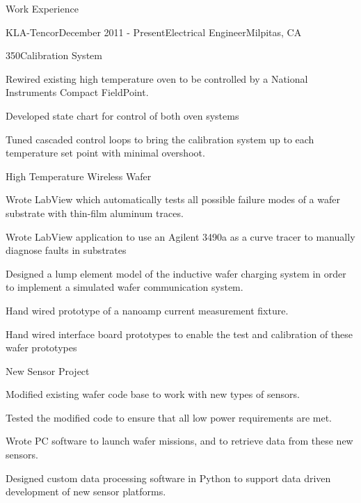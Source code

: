 \documentclass{resume} %
\begin{document}

\begin{rSection}{Work Experience}

\begin{rSubsection}{KLA-Tencor}{December 2011 - Present}{Electrical Engineer}{Milpitas, CA}

\begin{rWorkProject}{350\celsius \space Calibration System}
\item Rewired existing high temperature oven to be controlled by a National Instruments Compact FieldPoint.
\item Developed state chart for control of both oven systems
\item Tuned cascaded control loops to bring the calibration system up to each temperature set point with minimal overshoot.
\end{rWorkProject}

\begin{rWorkProject}{High Temperature Wireless Wafer}
\item Wrote LabView which automatically tests all possible failure modes of a wafer substrate with thin-film aluminum traces.
\item Wrote LabView application to use an Agilent 3490a as a curve tracer to manually diagnose faults in substrates
\item Designed a lump element model of the inductive wafer charging system in order to implement a simulated wafer communication system.
\item Hand wired prototype of a nanoamp current measurement fixture.
\item Hand wired interface board prototypes to enable the test and calibration of these wafer prototypes
\end{rWorkProject}

\begin{rWorkProject}{New Sensor Project}
\item Modified existing wafer code base to work with new types of sensors.
\item Tested the modified code to ensure that all low power requirements are met.
\item Wrote PC software to launch wafer missions, and to retrieve data from these new sensors.
\item Designed custom data processing software in Python to support data driven development of new sensor platforms.
\end{rWorkProject}


\end{rSubsection}
\end{rSection}
\end{document}
